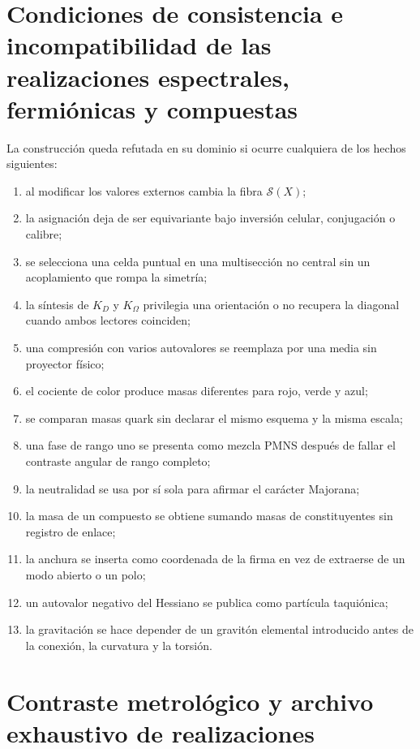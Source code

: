 \section{Condiciones de consistencia e incompatibilidad de las realizaciones espectrales, fermiónicas y compuestas}

La construcción queda refutada en su dominio si ocurre cualquiera de los
hechos siguientes:

\begin{enumerate}
\item al modificar los valores externos cambia la fibra \(\mathscr S(X)\);
\item la asignación deja de ser equivariante bajo inversión celular,
      conjugación o calibre;
\item se selecciona una celda puntual en una multisección no central sin un
      acoplamiento que rompa la simetría;
\item la síntesis de \(K_D\) y \(K_\Omega\) privilegia una orientación o no
      recupera la diagonal cuando ambos lectores coinciden;
\item una compresión con varios autovalores se reemplaza por una media sin
      proyector físico;
\item el cociente de color produce masas diferentes para rojo, verde y azul;
\item se comparan masas quark sin declarar el mismo esquema y la misma escala;
\item una fase de rango uno se presenta como mezcla PMNS después de fallar el
      contraste angular de rango completo;
\item la neutralidad se usa por sí sola para afirmar el carácter Majorana;
\item la masa de un compuesto se obtiene sumando masas de constituyentes sin
      registro de enlace;
\item la anchura se inserta como coordenada de la firma en vez de extraerse de
      un modo abierto o un polo;
\item un autovalor negativo del Hessiano se publica como partícula taquiónica;
\item la gravitación se hace depender de un gravitón elemental introducido
      antes de la conexión, la curvatura y la torsión.
\end{enumerate}

\section{Contraste metrológico y archivo exhaustivo de realizaciones}

